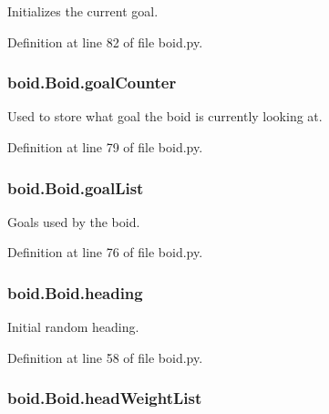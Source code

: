 Initializes the current goal. 



Definition at line 82 of file boid.\-py.

\hypertarget{classboid_1_1Boid_a8a871af6fc4d19477ce4881eb9ddc629}{
\subsubsection[{goal\-Counter}]{\setlength{\rightskip}{0pt plus 5cm}boid.\-Boid.\-goal\-Counter}}\label{classboid_1_1Boid_a8a871af6fc4d19477ce4881eb9ddc629}


Used to store what goal the boid is currently looking at. 



Definition at line 79 of file boid.\-py.

\hypertarget{classboid_1_1Boid_a7a3492977220ee1f7623aa9643a2fea4}{
\subsubsection[{goal\-List}]{\setlength{\rightskip}{0pt plus 5cm}boid.\-Boid.\-goal\-List}}\label{classboid_1_1Boid_a7a3492977220ee1f7623aa9643a2fea4}


Goals used by the boid. 



Definition at line 76 of file boid.\-py.

\hypertarget{classboid_1_1Boid_afc4b725b80313dc3604ac36015f84156}{
\subsubsection[{heading}]{\setlength{\rightskip}{0pt plus 5cm}boid.\-Boid.\-heading}}\label{classboid_1_1Boid_afc4b725b80313dc3604ac36015f84156}


Initial random heading. 



Definition at line 58 of file boid.\-py.

\hypertarget{classboid_1_1Boid_a4b192d2b077b52005a82df5d98748190}{
\subsubsection[{head\-Weight\-List}]{\setlength{\rightskip}{0pt plus 5cm}boid.\-Boid.\-head\-Weight\-List}}\label{classboid_1_1Boid_a4b192d2b077b52005a82df5d98748190}


